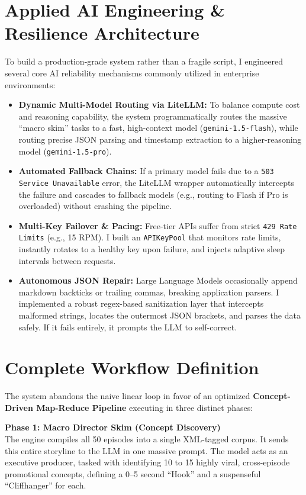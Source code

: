\documentclass[10pt, a4paper]{article}
\begin{document}
\section{Applied AI Engineering \& Resilience Architecture}
To build a production-grade system rather than a fragile script, I engineered several core AI reliability mechanisms commonly utilized in enterprise environments:
\begin{itemize}
    \item \textbf{Dynamic Multi-Model Routing via LiteLLM:} To balance compute cost and reasoning capability, the system programmatically routes the massive ``macro skim'' tasks to a fast, high-context model (\texttt{gemini-1.5-flash}), while routing precise JSON parsing and timestamp extraction to a higher-reasoning model (\texttt{gemini-1.5-pro}). 
    \item \textbf{Automated Fallback Chains:} If a primary model fails due to a \texttt{503 Service Unavailable} error, the LiteLLM wrapper automatically intercepts the failure and cascades to fallback models (e.g., routing to Flash if Pro is overloaded) without crashing the pipeline.
    \item \textbf{Multi-Key Failover \& Pacing:} Free-tier APIs suffer from strict \texttt{429 Rate Limits} (e.g., 15 RPM). I built an \texttt{APIKeyPool} that monitors rate limits, instantly rotates to a healthy key upon failure, and injects adaptive sleep intervals between requests.
    \item \textbf{Autonomous JSON Repair:} Large Language Models occasionally append markdown backticks or trailing commas, breaking application parsers. I implemented a robust regex-based sanitization layer that intercepts malformed strings, locates the outermost JSON brackets, and parses the data safely. If it fails entirely, it prompts the LLM to self-correct.
\end{itemize}

\section{Complete Workflow Definition}
The system abandons the naive linear loop in favor of an optimized \textbf{Concept-Driven Map-Reduce Pipeline} executing in three distinct phases:

\textbf{Phase 1: Macro Director Skim (Concept Discovery)} \\
The engine compiles all 50 episodes into a single XML-tagged corpus. It sends this entire storyline to the LLM in one massive prompt. The model acts as an executive producer, tasked with identifying 10 to 15 highly viral, cross-episode promotional concepts, defining a 0--5 second ``Hook'' and a suspenseful ``Cliffhanger'' for each.
\end{document}
